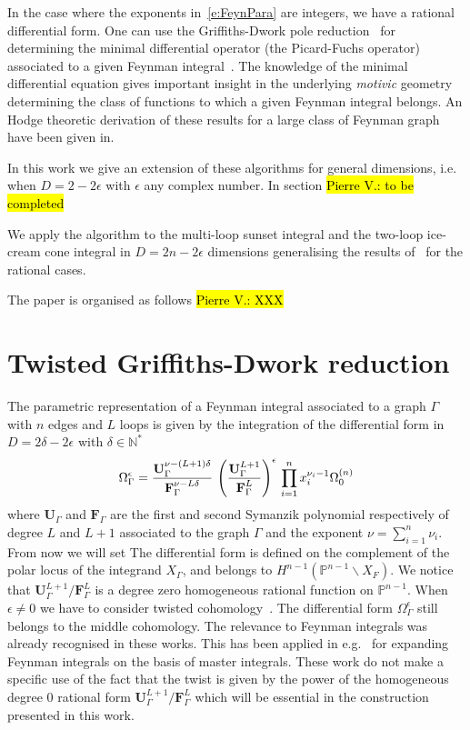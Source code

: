 \documentclass[a4paper,12pt]{article}
\numberwithin{equation}{section}
\numberwithin{figure}{section}
\newcommand{\pvnote}[1]{\sethlcolor{bubblegum} \protect\hl{Pierre V.: #1} \sethlcolor{yellow}}
\begin{document}
In the case where the exponents in~\eqref{e:FeynPara} are integers,
we have a rational differential form. One can use the  Griffiths-Dwork
pole reduction~\cite{Griffiths_1969,Griffith1,Griffith2,Dwork_1962,Dwork_1964} for determining the minimal differential operator (the
Picard-Fuchs operator) associated to a given Feynman integral~\cite{Bloch:2016izu,Vanhove:2018mto,Lairez:2022zkj}.
The knowledge of the minimal differential equation
gives important insight in the underlying \emph{motivic} geometry
determining the class of functions to which a given Feynman integral
belongs. An Hodge theoretic derivation of these results for a large
class of Feynman graph have been given in\cite{Doran:2023yzu}.


In this work we give an extension of these algorithms for
general dimensions, i.e. when $D=2-2\epsilon$ with $\epsilon$ any
complex number.  In section \pvnote{to be completed}


We apply the algorithm to the multi-loop sunset
integral and the two-loop ice-cream cone integral in $D=2n-2\epsilon$
dimensions generalising the results
of~\cite{Lairez:2022zkj,Doran:2023yzu} for the rational cases.

The paper is organised as follows \pvnote{XXX}
\section{Twisted Griffiths-Dwork reduction}
\label{sec:griff-dwork-reduct}

The parametric representation of a Feynman integral associated to a
graph $\Gamma$ with $n$ edges and $L$ loops is given by the integration of the differential
form  in  $D=2\delta-2\epsilon$ with $\delta\in\mathbb N^*$
\begin{equation}
  \Omega^\epsilon_\Gamma={\textbf{U}_\Gamma^{\nu-(L+1)\delta} \over \textbf{F}_\Gamma^{\nu-L\delta}}\,
  \left(\textbf{U}_\Gamma^{L+1}\over \textbf{F}_\Gamma^L\right)^{\epsilon} \, \prod_{i=1}^n x_i^{\nu_i-1} \Omega^{(n)}_0  
\end{equation}
%
where $\textbf{U}_\Gamma$ and $\textbf{F}_\Gamma$ are the first and second Symanzik
polynomial respectively of degree $L$ and $L+1$ associated to the
graph $\Gamma$ and the exponent $\nu=\sum_{i=1}^n \nu_i$. From now we will set
The differential form is defined on the complement of the polar locus
of the integrand $X_\Gamma$, and belongs to $H^{n-1}( \mathbb
P^{n-1}\backslash X_F)$. We notice that   $\textbf{U}_\Gamma^{L+1}/\textbf{F}_\Gamma^L$ is a degree
zero homogeneous rational function on $\mathbb
P^{n-1}$. When $\epsilon\neq0$ we have to consider twisted
cohomology~\cite{Aomoto1,Aomoto,Aomoto_1982,AomotoBook}. The differential form
$\Omega_\Gamma^\epsilon$ still belongs to the middle cohomology. The
relevance to Feynman integrals was already recognised in these works. 
This has been applied in
e.g.~\cite{Mizera:2017rqa,Frellesvig:2019uqt,Cacciatori:2021nli}  for
expanding Feynman integrals on the basis of master integrals. These
work do not make a specific use of the fact that the twist is given by
the power of the homogeneous degree 0 rational form
$\textbf{U}_\Gamma^{L+1}/\textbf{F}_\Gamma^L$ which will be essential
in the construction presented in this work.
\end{document}
